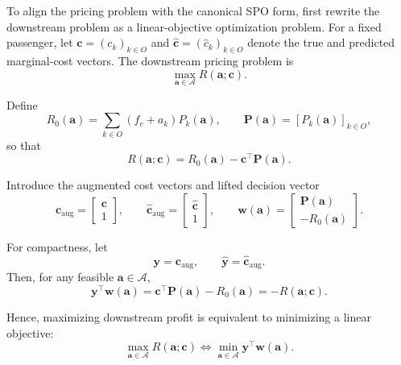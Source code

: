 \documentclass[preprint,12pt,authoryear]{elsarticle}
\begin{document}
To align the pricing problem with the canonical SPO form, first rewrite the downstream problem as a linear-objective optimization problem. For a fixed passenger, let $\mathbf{c}=(c_k)_{k\in O}$ and $\hat{\mathbf{c}}=(\hat{c}_k)_{k\in O}$ denote the true and predicted marginal-cost vectors. The downstream pricing problem is
\begin{equation}
\max_{\mathbf{a}\in\mathcal{A}} R(\mathbf{a};\mathbf{c}).
\tag{21}\label{eq:spo-downstream}
\end{equation}

Define
\begin{equation}
R_0(\mathbf{a}) = \sum_{k\in O}(f_e+a_k)P_k(\mathbf{a}),
\qquad
\mathbf{P}(\mathbf{a}) = [P_k(\mathbf{a})]_{k\in O},
\tag{22}\label{eq:r0}
\end{equation}
so that
\begin{equation}
R(\mathbf{a};\mathbf{c}) = R_0(\mathbf{a}) - \mathbf{c}^{\top}\mathbf{P}(\mathbf{a}).
\tag{23}\label{eq:rlinear}
\end{equation}

Introduce the augmented cost vectors and lifted decision vector
\begin{equation}
\mathbf{c}_{\mathrm{aug}}=
\begin{bmatrix}
\mathbf{c}\\
1
\end{bmatrix},
\qquad
\hat{\mathbf{c}}_{\mathrm{aug}}=
\begin{bmatrix}
\hat{\mathbf{c}}\\
1
\end{bmatrix},
\qquad
\mathbf{w}(\mathbf{a})=
\begin{bmatrix}
\mathbf{P}(\mathbf{a})\\
-R_0(\mathbf{a})
\end{bmatrix}.
\tag{24}\label{eq:augmented}
\end{equation}

For compactness, let
\begin{equation}
\mathbf{y}=\mathbf{c}_{\mathrm{aug}},
\qquad
\hat{\mathbf{y}}=\hat{\mathbf{c}}_{\mathrm{aug}}.
\tag{25}\label{eq:ydef}
\end{equation}
Then, for any feasible $\mathbf{a}\in\mathcal{A}$,
\begin{equation}
\mathbf{y}^{\top}\mathbf{w}(\mathbf{a})
= \mathbf{c}^{\top}\mathbf{P}(\mathbf{a}) - R_0(\mathbf{a})
= -R(\mathbf{a};\mathbf{c}).
\tag{26}\label{eq:yw}
\end{equation}

Hence, maximizing downstream profit is equivalent to minimizing a linear objective:
\begin{equation}
\max_{\mathbf{a}\in\mathcal{A}} R(\mathbf{a};\mathbf{c})
\Longleftrightarrow
\min_{\mathbf{a}\in\mathcal{A}} \mathbf{y}^{\top}\mathbf{w}(\mathbf{a}).
\tag{27}\label{eq:spo-primal}
\end{equation}
\end{document}

